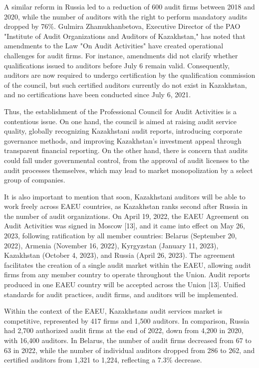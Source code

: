 \begin{multicols}{2}
A similar reform in Russia led to a reduction of 600 audit firms between
2018 and 2020, while the number of auditors with the right to perform
mandatory audits dropped by 76\%. Gulmira Zhamukhanbetova, Executive
Director of the PAO "Institute of Audit Organizations and Auditors of
Kazakhstan," has noted that amendments to the Law "On Audit Activities"
have created operational challenges for audit firms. For instance,
amendments did not clarify whether qualifications issued to auditors
before July 6 remain valid. Consequently, auditors are now required to
undergo certification by the qualification commission of the council,
but such certified auditors currently do not exist in Kazakhstan, and no
certifications have been conducted since July 6, 2021.

Thus, the establishment of the Professional Council for Audit Activities
is a contentious issue. On one hand, the council is aimed at raising
audit service quality, globally recognizing Kazakhstani audit reports,
introducing corporate governance methods, and improving Kazakhstan's
investment appeal through transparent financial reporting. On the other
hand, there is concern that audits could fall under governmental
control, from the approval of audit licenses to the audit processes
themselves, which may lead to market monopolization by a select group of
companies.

It is also important to mention that soon, Kazakhstani auditors will be
able to work freely across EAEU countries, as Kazakhstan ranks second
after Russia in the number of audit organizations. On April 19, 2022,
the EAEU Agreement on Audit Activities was signed in Moscow {[}13{]},
and it came into effect on May 26, 2023, following ratification by all
member countries: Belarus (September 20, 2022), Armenia (November 16,
2022), Kyrgyzstan (January 11, 2023), Kazakhstan (October 4, 2023), and
Russia (April 26, 2023). The agreement facilitates the creation of a
single audit market within the EAEU, allowing audit firms from any
member country to operate throughout the Union. Audit reports produced
in one EAEU country will be accepted across the Union {[}13{]}. Unified
standards for audit practices, audit firms, and auditors will be
implemented.

Within the context of the EAEU, Kazakhstan\textquotesingle s audit
services market is competitive, represented by 417 firms and 1,500
auditors. In comparison, Russia had 2,700 authorized audit firms at the
end of 2022, down from 4,200 in 2020, with 16,400 auditors. In Belarus,
the number of audit firms decreased from 67 to 63 in 2022, while the
number of individual auditors dropped from 286 to 262, and certified
auditors from 1,321 to 1,224, reflecting a 7.3\% decrease.


\end{multicols}
